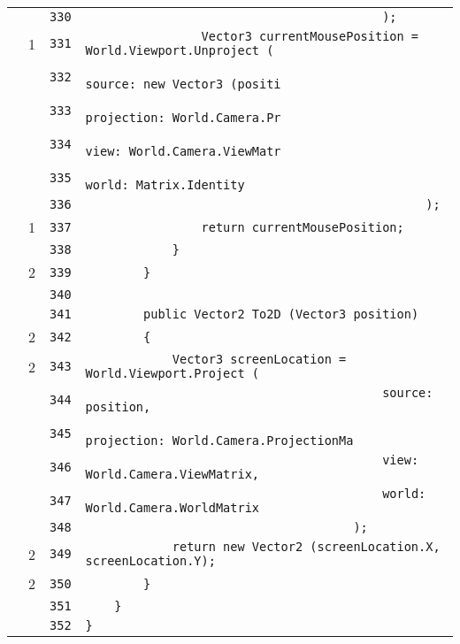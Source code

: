\documentclass[a4paper,10pt]{article}
\begin{document}
\begin{longtable}[l]{lrrl}
\cellcolor{gray} &  & \verb~330~ & \verb~                                         );~\\
\cellcolor{green} & 1 & \verb~331~ & \verb~                Vector3 currentMousePosition = World.Viewport.Unproject (~\\
\cellcolor{gray} &  & \verb~332~ & \verb~                                                   source: new Vector3 (positi~\\
\cellcolor{gray} &  & \verb~333~ & \verb~                                                   projection: World.Camera.Pr~\\
\cellcolor{gray} &  & \verb~334~ & \verb~                                                   view: World.Camera.ViewMatr~\\
\cellcolor{gray} &  & \verb~335~ & \verb~                                                   world: Matrix.Identity~\\
\cellcolor{gray} &  & \verb~336~ & \verb~                                               );~\\
\cellcolor{green} & 1 & \verb~337~ & \verb~                return currentMousePosition;~\\
\cellcolor{gray} &  & \verb~338~ & \verb~            }~\\
\cellcolor{green} & 2 & \verb~339~ & \verb~        }~\\
\cellcolor{gray} &  & \verb~340~ & \verb~~\\
\cellcolor{gray} &  & \verb~341~ & \verb~        public Vector2 To2D (Vector3 position)~\\
\cellcolor{green} & 2 & \verb~342~ & \verb~        {~\\
\cellcolor{green} & 2 & \verb~343~ & \verb~            Vector3 screenLocation = World.Viewport.Project (~\\
\cellcolor{gray} &  & \verb~344~ & \verb~                                         source: position,~\\
\cellcolor{gray} &  & \verb~345~ & \verb~                                         projection: World.Camera.ProjectionMa~\\
\cellcolor{gray} &  & \verb~346~ & \verb~                                         view: World.Camera.ViewMatrix,~\\
\cellcolor{gray} &  & \verb~347~ & \verb~                                         world: World.Camera.WorldMatrix~\\
\cellcolor{gray} &  & \verb~348~ & \verb~                                     );~\\
\cellcolor{green} & 2 & \verb~349~ & \verb~            return new Vector2 (screenLocation.X, screenLocation.Y);~\\
\cellcolor{green} & 2 & \verb~350~ & \verb~        }~\\
\cellcolor{gray} &  & \verb~351~ & \verb~    }~\\
\cellcolor{gray} &  & \verb~352~ & \verb~}~\\
\end{longtable}
\newpage
\end{document}
